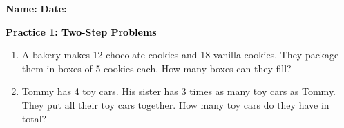 \documentclass[12pt, letterpaper, fleqn]{article}
\begin{document}
\textbf{Name:} \underline{\hspace{5cm}}
\hfill
\textbf{Date:} \underline{\hspace{3cm}}\\

\begin{tcolorbox}[colback=customteal!20]
    \large\textcolor{black}{\textbf{Practice 1: Two-Step Problems}}
\end{tcolorbox}

\vspace{5mm}
\begin{enumerate}[itemsep=4.5cm, leftmargin=0.6cm]
\item A bakery makes 12 chocolate cookies and 18 vanilla cookies. They package them in boxes of 5 cookies each. How many boxes can they fill?

\item Tommy has 4 toy cars. His sister has 3 times as many toy cars as Tommy. They put all their toy cars together. How many toy cars do they have in total?

\end{enumerate}
\end{document}
